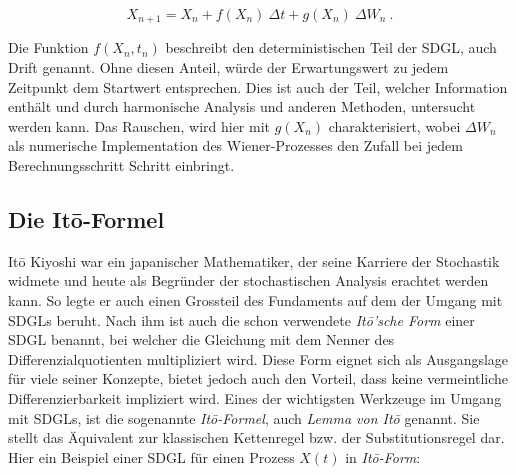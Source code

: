\begin{equation}
	X_{n+1} = X_n + f(X_n) \ \Delta t + g(X_n) \ \Delta W_n \ .
\end{equation}

Die Funktion $ f(X_n,t_n) $ beschreibt den deterministischen Teil der SDGL, auch Drift genannt. Ohne diesen Anteil, würde der Erwartungswert zu jedem Zeitpunkt dem Startwert entsprechen. Dies ist auch der Teil, welcher Information enthält und durch harmonische Analysis und anderen Methoden, untersucht werden kann. Das Rauschen, wird hier mit $ g(X_n) $ charakterisiert, wobei $ \Delta W_n $ als numerische Implementation des Wiener-Prozesses den Zufall bei jedem Berechnungsschritt Schritt einbringt.



\subsection{Die Itō-Formel\label{brown:ito}}

Itō Kiyoshi war ein japanischer Mathematiker, der seine Karriere der Stochastik widmete und heute als Begründer der stochastischen Analysis erachtet werden kann. So legte er auch einen Grossteil des Fundaments auf dem der Umgang mit SDGLs beruht. Nach ihm ist auch die schon verwendete \textit{Itō'sche Form} einer SDGL benannt, bei welcher die Gleichung mit dem Nenner des Differenzialquotienten multipliziert wird. Diese Form eignet sich als Ausgangslage für viele seiner Konzepte, bietet jedoch auch den Vorteil, dass keine vermeintliche Differenzierbarkeit impliziert wird.
Eines der wichtigsten Werkzeuge im Umgang mit SDGLs, ist die sogenannte \textit{Itō-Formel}, auch \textit{Lemma von Itō} genannt. Sie stellt das Äquivalent zur klassischen Kettenregel bzw. der Substitutionsregel dar. Hier ein Beispiel einer SDGL für einen Prozess $ X(t) $ in \textit{Itō-Form}:


